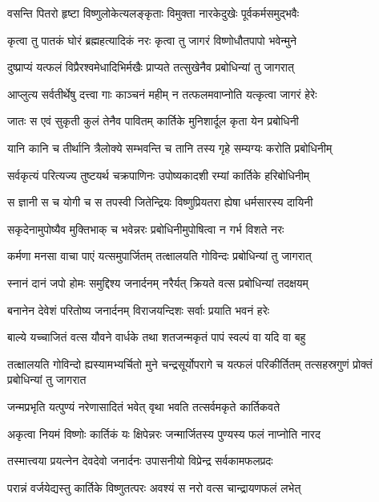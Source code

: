 \twolineshloka
{वसन्ति पितरो हृष्टा विष्णुलोकेत्यलङ्कृताः}
{विमुक्ता नारकेदुखेः पूर्वकर्मसमुद्भवैः} %

\twolineshloka
{कृत्वा तु पातकं घोरं ब्रह्महत्यादिकं नरः}
{कृत्वा तु जागरं विष्णोधौतपापो भवेन्मुने} %

\twolineshloka
{दुष्प्राप्यं यत्फलं विप्रैरश्वमेधादिभिर्मखैः}
{प्राप्यते तत्सुखेनैव प्रबोधिन्यां तु जागरात्} %

\twolineshloka
{आप्लुत्य सर्वतीर्थेषु दत्त्वा गाः काञ्चनं महीम्}
{न तत्फलमवाप्नोति यत्कृत्वा जागरं हेरेः} %

\twolineshloka
{जातः स एवं सुकृती कुलं तेनैव पावितम्}
{कार्तिके मुनिशार्दूल कृता येन प्रबोधिनी} %

\twolineshloka
{यानि कानि च तीर्थानि त्रैलोक्ये सम्भवन्ति च}
{तानि तस्य गृहे सम्यग्यः करोति प्रबोधिनीम्} %

\twolineshloka
{सर्वकृत्यं परित्यज्य तुष्टयर्थ चक्रपाणिनः}
{उपोष्यकादशी रम्यां कार्तिके हरिबोधिनीम्} %

\twolineshloka
{स ज्ञानी स च योगी च स तपस्वी जितेन्द्रियः}
{विष्णुप्रियतरा ह्येषा धर्मसारस्य दायिनी} %

\twolineshloka
{सकृदेनामुपोष्यैव मुक्तिभाक् च भवेन्नरः}
{प्रबोधिनीमुपोषित्वा न गर्भ विशते नरः} %

\twolineshloka
{कर्मणा मनसा वाचा पाएं यत्समुपार्जितम्}
{तत्क्षालयति गोविन्दः प्रबोधिन्यां तु जागरात्} %

\twolineshloka
{स्नानं दानं जपो होमः समुद्दिश्य जनार्दनम्}
{नरैर्यत् क्रियते वत्स प्रबोधिन्यां तदक्षयम्} %

\twolineshloka
{बनानेन देवेशं परितोष्य जनार्दनम्}
{विराजयन्दिशः सर्वाः प्रयाति भवनं हरेः} %

\twolineshloka
{बाल्ये यच्चाजितं वत्स यौवने वार्धके तथा}
{शतजन्मकृतं पापं स्वल्पं वा यदि वा बहु} %


\threelineshloka
{तत्क्षालयति गोविन्दो ह्यस्यामभ्यर्चितो मुने}
{चन्द्रसूर्योपरागे च यत्फलं परिकीर्तितम्}
{तत्सहस्रगुणं प्रोक्तं प्रबोधिन्यां तु जागरात} %

\twolineshloka
{जन्मप्रभृति यत्पुण्यं नरेणासादितं भवेत्}
{वृथा भवति तत्सर्वमकृते कार्तिकवते} %

\twolineshloka
{अकृत्वा नियमं विष्णोः कार्तिकं यः क्षिपेन्नरः}
{जन्मार्जितस्य पुण्यस्य फलं नाप्नोति नारद} %

\twolineshloka
{तस्मात्त्वया प्रयत्नेन देवदेवो जनार्दनः}
{उपासनीयो विप्रेन्द्र सर्वकामफलप्रदः} %

\twolineshloka
{परान्नं वर्जयेद्यस्तु कार्तिके विष्णुतत्परः}
{अवश्यं स नरो वत्स चान्द्रायणफलं लभेत्} %

